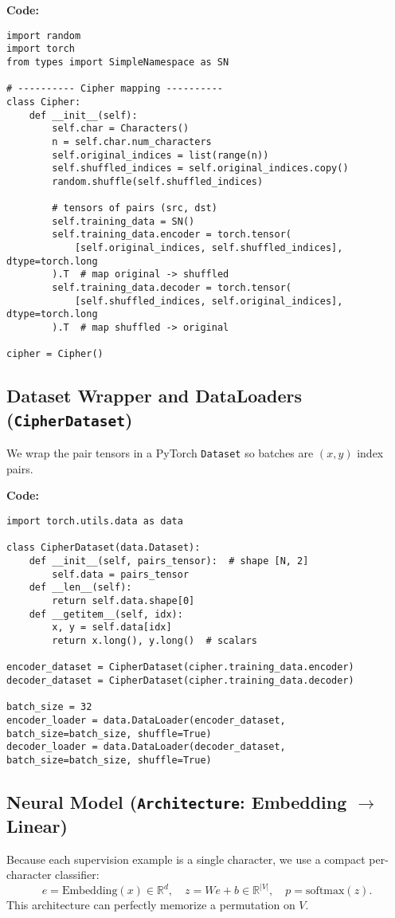 \documentclass[12pt]{article}
\begin{document}
\noindent\textbf{Code:}
\begin{verbatim}
import random
import torch
from types import SimpleNamespace as SN

# ---------- Cipher mapping ----------
class Cipher:
    def __init__(self):
        self.char = Characters()
        n = self.char.num_characters
        self.original_indices = list(range(n))
        self.shuffled_indices = self.original_indices.copy()
        random.shuffle(self.shuffled_indices)

        # tensors of pairs (src, dst)
        self.training_data = SN()
        self.training_data.encoder = torch.tensor(
            [self.original_indices, self.shuffled_indices], dtype=torch.long
        ).T  # map original -> shuffled
        self.training_data.decoder = torch.tensor(
            [self.shuffled_indices, self.original_indices], dtype=torch.long
        ).T  # map shuffled -> original

cipher = Cipher()
\end{verbatim}

\subsection{Dataset Wrapper and DataLoaders (\texttt{CipherDataset})}
We wrap the pair tensors in a PyTorch \texttt{Dataset} so batches are $(x,y)$ index pairs.

\noindent\textbf{Code:}
\begin{verbatim}
import torch.utils.data as data

class CipherDataset(data.Dataset):
    def __init__(self, pairs_tensor):  # shape [N, 2]
        self.data = pairs_tensor
    def __len__(self):
        return self.data.shape[0]
    def __getitem__(self, idx):
        x, y = self.data[idx]
        return x.long(), y.long()  # scalars

encoder_dataset = CipherDataset(cipher.training_data.encoder)
decoder_dataset = CipherDataset(cipher.training_data.decoder)

batch_size = 32
encoder_loader = data.DataLoader(encoder_dataset, batch_size=batch_size, shuffle=True)
decoder_loader = data.DataLoader(decoder_dataset, batch_size=batch_size, shuffle=True)
\end{verbatim}

\subsection{Neural Model (\texttt{Architecture}: Embedding $\rightarrow$ Linear)}
Because each supervision example is a single character, we use a compact per-character classifier:
\[
e = \mathrm{Embedding}(x)\in\mathbb{R}^{d},\quad
z = W e + b\in\mathbb{R}^{|V|},\quad
p=\mathrm{softmax}(z).
\]
This architecture can perfectly memorize a permutation on $V$.
\end{document}
